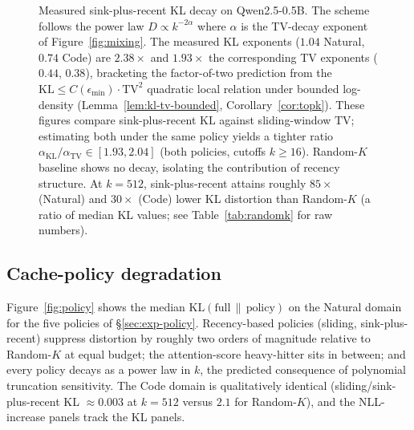 \documentclass[11pt]{article}
\newcommand{\KLs}{\mathrm{KL}}
\newcommand{\TV}{\mathrm{TV}}
\theoremstyle{plain}
\theoremstyle{definition}
\theoremstyle{remark}
\begin{document}
\begin{figure}[ht]
\centering
{}
\caption{Measured sink-plus-recent KL decay on Qwen2.5-0.5B. The
scheme follows the power law $D \propto k^{-2\alpha}$ where $\alpha$
is the TV-decay exponent of Figure~\ref{fig:mixing}. The measured
KL exponents ($1.04$ Natural, $0.74$ Code) are $2.38\times$ and
$1.93\times$ the corresponding TV exponents ($0.44$, $0.38$),
bracketing the factor-of-two prediction from the
$\KLs \leq C(\epsilon_{\min}) \cdot \TV^2$ quadratic local relation
under bounded log-density (Lemma~\ref{lem:kl-tv-bounded},
Corollary~\ref{cor:topk}). These figures compare sink-plus-recent
$\KLs$ against sliding-window $\TV$; estimating both under the same
policy yields a tighter ratio $\alpha_{\KLs}/\alpha_{\TV} \in [1.93,
2.04]$ (both policies, cutoffs $k \ge 16$). Random-$K$ baseline shows no decay,
isolating the contribution of recency structure. At $k = 512$,
sink-plus-recent attains roughly $85\times$ (Natural) and
$30\times$ (Code) lower KL distortion than Random-$K$ (a ratio of
median KL values; see Table~\ref{tab:randomk} for raw numbers).}
\label{fig:topk}
\end{figure}

\subsection{Cache-policy degradation}
\label{app:exp-policy}
Figure~\ref{fig:policy} shows the median
$\KLs(\text{full}\,\|\,\text{policy})$ on the Natural domain for the
five policies of \S\ref{sec:exp-policy}. Recency-based policies
(sliding, sink-plus-recent) suppress distortion by roughly two orders
of magnitude relative to Random-$K$ at equal budget; the
attention-score heavy-hitter sits in between; and every policy decays
as a power law in $k$, the predicted consequence of polynomial
truncation sensitivity. The Code domain is qualitatively identical
(sliding/sink-plus-recent KL $\approx 0.003$ at $k = 512$ versus
$2.1$ for Random-$K$), and the NLL-increase panels track the KL
panels.
\end{document}
